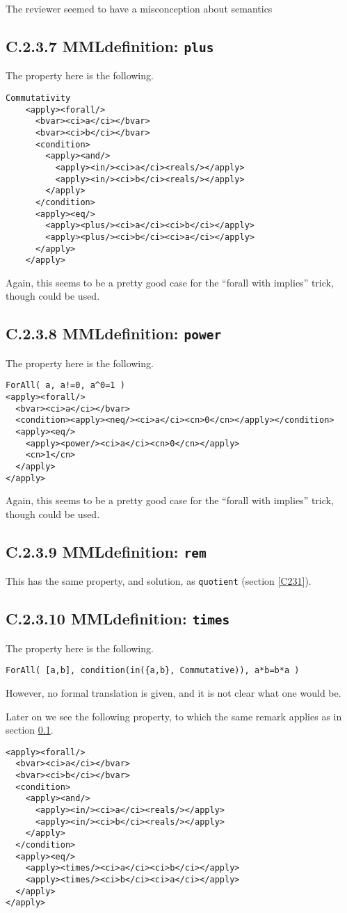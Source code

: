 \documentclass{llncs}
\begin{document}
\begin{newpart}{The reviewer seemed to have a misconception about semantics}
\subsection{C.2.3.7 MMLdefinition: {\tt plus}}\label{C237}
The property here is the following.
\begin{lstlisting}[language=MathML2]
    Commutativity 
    <apply><forall/>
      <bvar><ci>a</ci></bvar>
      <bvar><ci>b</ci></bvar>
      <condition>
        <apply><and/>
          <apply><in/><ci>a</ci><reals/></apply>
          <apply><in/><ci>b</ci><reals/></apply>
        </apply>
      </condition>
      <apply><eq/>
        <apply><plus/><ci>a</ci><ci>b</ci></apply>
        <apply><plus/><ci>b</ci><ci>a</ci></apply>
      </apply>
    </apply>
\end{lstlisting}
Again, this seems to be a pretty good case for the ``forall with implies''
trick, though {} could be used.
\subsection{C.2.3.8 MMLdefinition: {\tt power}}\label{C238}
The property here is the following.
\begin{lstlisting}[language=MathML2]
ForAll( a, a!=0, a^0=1 ) 
<apply><forall/>
  <bvar><ci>a</ci></bvar>
  <condition><apply><neq/><ci>a</ci><cn>0</cn></apply></condition>
  <apply><eq/>
    <apply><power/><ci>a</ci><cn>0</cn></apply>
    <cn>1</cn>
  </apply>
</apply>
\end{lstlisting}
Again, this seems to be a pretty good case for the ``forall with implies''
trick, though {} could be used.
\subsection{C.2.3.9 MMLdefinition: {\tt rem}}\label{C239}
This has the same property, and solution, as {\tt quotient} (section
\ref{C231}).
\subsection{C.2.3.10 MMLdefinition: {\tt times}}\label{C2310}
The property here is the following.
\begin{lstlisting} 
ForAll( [a,b], condition(in({a,b}, Commutative)), a*b=b*a )
\end{lstlisting}
However, no formal translation is given, and it is not clear what one would
be.
\par
Later on we see the following property, to which the same remark applies as in
section \ref{C237}.
\begin{lstlisting}[language=MathML2]
<apply><forall/>
  <bvar><ci>a</ci></bvar>
  <bvar><ci>b</ci></bvar>
  <condition>
    <apply><and/>
      <apply><in/><ci>a</ci><reals/></apply>
      <apply><in/><ci>b</ci><reals/></apply>
    </apply>
  </condition>
  <apply><eq/>
    <apply><times/><ci>a</ci><ci>b</ci></apply>
    <apply><times/><ci>b</ci><ci>a</ci></apply>
  </apply>
</apply> 
\end{lstlisting}

\end{newpart}
\end{document}

